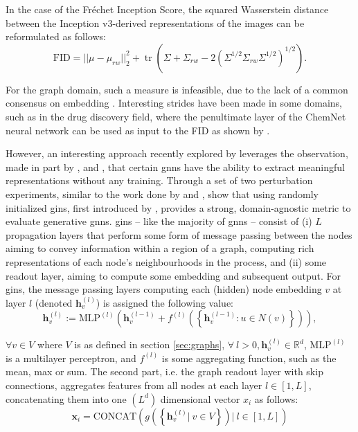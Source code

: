 In the case of the Fr\'echet Inception Score, the squared Wasserstein distance
between the Inception v3-derived representations of the images can be
reformulated as follows:
\begin{equation}
  \label{eq:fid}
  \text{FID}=||\mu -\mu _{rw}||_{2}^{2}+\operatorname {tr} (\Sigma +\Sigma
_{rw}-2(\Sigma ^{1/2}\Sigma _{rw}\Sigma ^{1/2})^{1/2}).
\end{equation}

For the graph domain, such a measure is infeasible, due to the lack of a common
consensus on embedding \cite{xu2021understanding}. Interesting strides have been
made in some domains, such as in the drug discovery field, where the penultimate
layer of the ChemNet neural network can be used as input to the FID as shown by
\cite{preuer2018frechet}.

However, an interesting approach recently explored by
\cite{thompson2022evaluation} leverages the observation, made in part by
\cite{xu2018powerful,morris2019weisfeiler}, and \cite{kipf2016semi}, that
certain \acrfull{gnns} have the ability to extract meaningful representations
without any training. Through a set of two perturbation experiments, similar to
the work done by \cite{xu2018empirical} and \cite{obray2022evaluation},
\cite{thompson2022evaluation} show that using randomly initialized
\acrfull{gins}, first introduced by \cite{xu2018powerful}, provides a strong,
domain-agnostic metric to evaluate generative \acrshort{gnns}. \acrshort{gins}
-- like the majority of \acrshort{gnns} -- consist of (i) $L$ propagation layers
that perform some form of message passing between the nodes aiming to convey
information within a region of a graph, computing rich representations of each
node's neighbourhoods in the process, and (ii) some readout layer, aiming to
compute some embedding and subsequent output. For \acrshort{gins}, the message
passing layers computing each (hidden) node embedding $v$ at layer $l$ (denoted
$\mathbf{h}_{v}^{(l)}$) is assigned the following value:
\begin{equation}
  \label{eq:mplgin}
  \mathbf{h}_{v}^{(l)}:=\text{MLP}^{(l)}\left(\mathbf{h}_{v}^{(l-1)} +
f^{(l)}\left(\left\{ \mathbf{h}_{v}^{(l-1)}: u\in N(v)\right\}\right)\right),
\end{equation}

$\forall v\in V$ where $V$ is as defined in section \ref{sec:graphs},
$\forall\ l>0, \mathbf{h}_{v}^{(l)}\in\mathbb{R}^d$, $\text{MLP}^{(l)}$ is a
multilayer perceptron, and $f^{(l)}$ is some aggregating function, such as the mean,
max or sum. The second part, i.e. the graph readout layer with skip connections,
aggregates features from all nodes at each layer $l\in [1,L]$, concatenating
them into one $(L^d)$ dimensional vector $x_i$ as follows:
\begin{equation}
  \label{eq:readout_gin}
  \mathbf{x}_i = \text{CONCAT}\left(  g\left( \left\{ \mathbf{h}_{v}^{(l)} |\ v\in V \right\} \right) |\ l \in [1, L] \right)
\end{equation}

